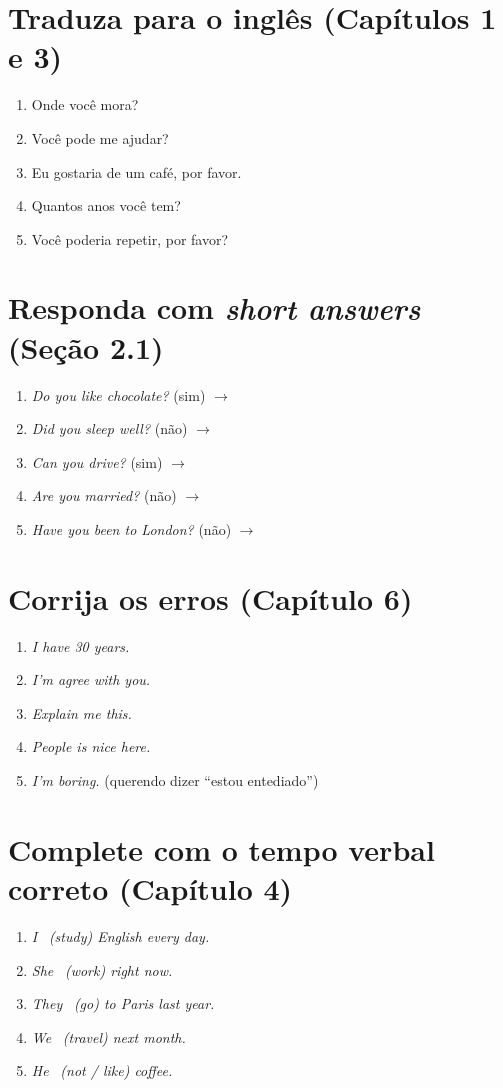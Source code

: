 \documentclass[12pt,a4paper,oneside]{book}
\newcommand{\en}[1]{\textit{#1}}                 %
\newcommand{\blank}{\underline{\hspace{1.4cm}}}
\newcommand{\ra}{$\rightarrow$}
\begin{document}
\section{Traduza para o inglês (Capítulos 1 e 3)}
\begin{enumerate}
  \item Onde você mora?
  \item Você pode me ajudar?
  \item Eu gostaria de um café, por favor.
  \item Quantos anos você tem?
  \item Você poderia repetir, por favor?
\end{enumerate}

\section{Responda com \emph{short answers} (Seção 2.1)}
\begin{enumerate}
  \item \en{Do you like chocolate?} (sim) \ra\ \blank\blank
  \item \en{Did you sleep well?} (não) \ra\ \blank\blank
  \item \en{Can you drive?} (sim) \ra\ \blank\blank
  \item \en{Are you married?} (não) \ra\ \blank\blank
  \item \en{Have you been to London?} (não) \ra\ \blank\blank
\end{enumerate}

\section{Corrija os erros (Capítulo 6)}
\begin{enumerate}
  \item \en{I have 30 years.}
  \item \en{I'm agree with you.}
  \item \en{Explain me this.}
  \item \en{People is nice here.}
  \item \en{I'm boring.} (querendo dizer ``estou entediado'')
\end{enumerate}

\section{Complete com o tempo verbal correto (Capítulo 4)}
\begin{enumerate}
  \item \en{I} \blank\ \en{(study) English every day.}
  \item \en{She} \blank\ \en{(work) right now.}
  \item \en{They} \blank\ \en{(go) to Paris last year.}
  \item \en{We} \blank\ \en{(travel) next month.}
  \item \en{He} \blank\ \en{(not / like) coffee.}
\end{enumerate}
\end{document}
